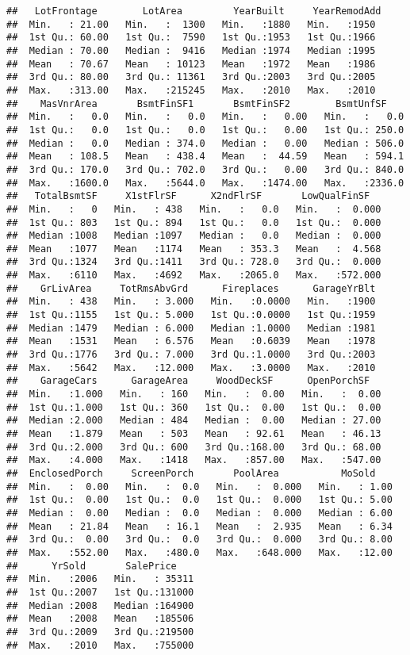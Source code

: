 \documentclass[
]{article}
\begin{document}
\begin{verbatim}
##   LotFrontage        LotArea         YearBuilt     YearRemodAdd 
##  Min.   : 21.00   Min.   :  1300   Min.   :1880   Min.   :1950  
##  1st Qu.: 60.00   1st Qu.:  7590   1st Qu.:1953   1st Qu.:1966  
##  Median : 70.00   Median :  9416   Median :1974   Median :1995  
##  Mean   : 70.67   Mean   : 10123   Mean   :1972   Mean   :1986  
##  3rd Qu.: 80.00   3rd Qu.: 11361   3rd Qu.:2003   3rd Qu.:2005  
##  Max.   :313.00   Max.   :215245   Max.   :2010   Max.   :2010  
##    MasVnrArea       BsmtFinSF1       BsmtFinSF2        BsmtUnfSF     
##  Min.   :   0.0   Min.   :   0.0   Min.   :   0.00   Min.   :   0.0  
##  1st Qu.:   0.0   1st Qu.:   0.0   1st Qu.:   0.00   1st Qu.: 250.0  
##  Median :   0.0   Median : 374.0   Median :   0.00   Median : 506.0  
##  Mean   : 108.5   Mean   : 438.4   Mean   :  44.59   Mean   : 594.1  
##  3rd Qu.: 170.0   3rd Qu.: 702.0   3rd Qu.:   0.00   3rd Qu.: 840.0  
##  Max.   :1600.0   Max.   :5644.0   Max.   :1474.00   Max.   :2336.0  
##   TotalBsmtSF     X1stFlrSF      X2ndFlrSF       LowQualFinSF    
##  Min.   :   0   Min.   : 438   Min.   :   0.0   Min.   :  0.000  
##  1st Qu.: 803   1st Qu.: 894   1st Qu.:   0.0   1st Qu.:  0.000  
##  Median :1008   Median :1097   Median :   0.0   Median :  0.000  
##  Mean   :1077   Mean   :1174   Mean   : 353.3   Mean   :  4.568  
##  3rd Qu.:1324   3rd Qu.:1411   3rd Qu.: 728.0   3rd Qu.:  0.000  
##  Max.   :6110   Max.   :4692   Max.   :2065.0   Max.   :572.000  
##    GrLivArea     TotRmsAbvGrd      Fireplaces      GarageYrBlt  
##  Min.   : 438   Min.   : 3.000   Min.   :0.0000   Min.   :1900  
##  1st Qu.:1155   1st Qu.: 5.000   1st Qu.:0.0000   1st Qu.:1959  
##  Median :1479   Median : 6.000   Median :1.0000   Median :1981  
##  Mean   :1531   Mean   : 6.576   Mean   :0.6039   Mean   :1978  
##  3rd Qu.:1776   3rd Qu.: 7.000   3rd Qu.:1.0000   3rd Qu.:2003  
##  Max.   :5642   Max.   :12.000   Max.   :3.0000   Max.   :2010  
##    GarageCars      GarageArea     WoodDeckSF      OpenPorchSF    
##  Min.   :1.000   Min.   : 160   Min.   :  0.00   Min.   :  0.00  
##  1st Qu.:1.000   1st Qu.: 360   1st Qu.:  0.00   1st Qu.:  0.00  
##  Median :2.000   Median : 484   Median :  0.00   Median : 27.00  
##  Mean   :1.879   Mean   : 503   Mean   : 92.61   Mean   : 46.13  
##  3rd Qu.:2.000   3rd Qu.: 600   3rd Qu.:168.00   3rd Qu.: 68.00  
##  Max.   :4.000   Max.   :1418   Max.   :857.00   Max.   :547.00  
##  EnclosedPorch     ScreenPorch       PoolArea           MoSold     
##  Min.   :  0.00   Min.   :  0.0   Min.   :  0.000   Min.   : 1.00  
##  1st Qu.:  0.00   1st Qu.:  0.0   1st Qu.:  0.000   1st Qu.: 5.00  
##  Median :  0.00   Median :  0.0   Median :  0.000   Median : 6.00  
##  Mean   : 21.84   Mean   : 16.1   Mean   :  2.935   Mean   : 6.34  
##  3rd Qu.:  0.00   3rd Qu.:  0.0   3rd Qu.:  0.000   3rd Qu.: 8.00  
##  Max.   :552.00   Max.   :480.0   Max.   :648.000   Max.   :12.00  
##      YrSold       SalePrice     
##  Min.   :2006   Min.   : 35311  
##  1st Qu.:2007   1st Qu.:131000  
##  Median :2008   Median :164900  
##  Mean   :2008   Mean   :185506  
##  3rd Qu.:2009   3rd Qu.:219500  
##  Max.   :2010   Max.   :755000
\end{verbatim}
\end{document}
